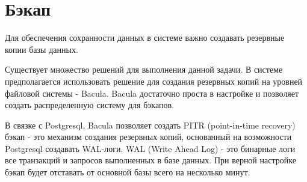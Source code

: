 \section{Бэкап}
Для обеспечения сохранности данных в системе важно создавать резервные копии
базы данных.

Существует множество решений для выполнения данной задачи. В системе
предполагается использовать решение для создания резервных копий на уровней
файловой системы - Bacula. Bacula достаточно проста в настройке и позволяет
создать распределенную систему для бэкапов.

В связке с Postgresql, Bacula позволяет создать PITR (point-in-time recovery)
бэкап - это механизм создания резервных копий, основанный на возможности
Postgresql создавать WAL-логи. WAL (Write Ahead Log) - это бинарные логи все
транзакций и запросов выполненных в базе данных. При верной настройке бэкап
будет отставать от основной базы всего на несколько минут.